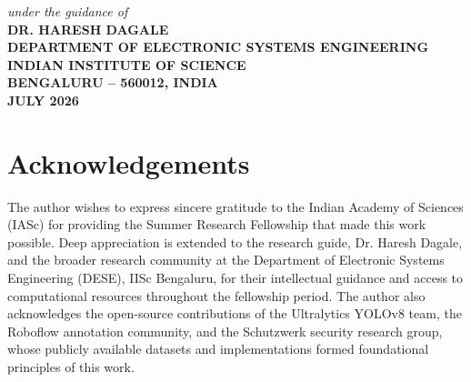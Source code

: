 \documentclass[12pt,a4paper]{report}
\begin{document}
\begin{titlepage}
\begin{center}
    {\em\large under the guidance of} \\[6pt]
    {\bfseries\large DR. HARESH DAGALE} \\[8pt]
    {\bfseries\large DEPARTMENT OF ELECTRONIC SYSTEMS ENGINEERING} \\[5pt]
    {\bfseries\large INDIAN INSTITUTE OF SCIENCE} \\[5pt]
    {\bfseries\large BENGALURU -- 560012, INDIA} \\[0.4in]

    {\bfseries\large JULY 2026}

  \end{center}
  \hypersetup{pageanchor=true}
\end{titlepage}




\newpage
\chapter*{Acknowledgements}

The author wishes to express sincere gratitude to the Indian Academy of Sciences (IASc) for providing the Summer Research Fellowship that made this work possible. Deep appreciation is extended to the research guide, Dr. Haresh Dagale, and the broader research community at the Department of Electronic Systems Engineering (DESE), IISc Bengaluru, for their intellectual guidance and access to computational resources throughout the fellowship period. The author also acknowledges the open-source contributions of the Ultralytics YOLOv8 team, the Roboflow annotation community, and the Schutzwerk security research group, whose publicly available datasets and implementations formed foundational principles of this work.

\newpage
\end{document}
